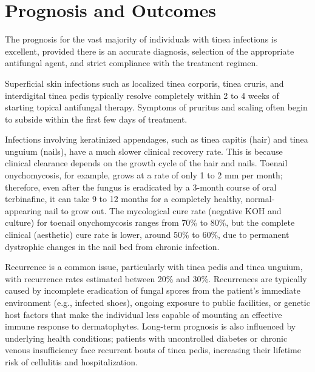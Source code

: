 \section*{Prognosis and Outcomes}
The prognosis for the vast majority of individuals with tinea infections is excellent, provided there is an accurate diagnosis, selection of the appropriate antifungal agent, and strict compliance with the treatment regimen.

Superficial skin infections such as localized tinea corporis, tinea cruris, and interdigital tinea pedis typically resolve completely within 2 to 4 weeks of starting topical antifungal therapy. Symptoms of pruritus and scaling often begin to subside within the first few days of treatment.

Infections involving keratinized appendages, such as tinea capitis (hair) and tinea unguium (nails), have a much slower clinical recovery rate. This is because clinical clearance depends on the growth cycle of the hair and nails. Toenail onychomycosis, for example, grows at a rate of only 1 to 2 mm per month; therefore, even after the fungus is eradicated by a 3-month course of oral terbinafine, it can take 9 to 12 months for a completely healthy, normal-appearing nail to grow out. The mycological cure rate (negative KOH and culture) for toenail onychomycosis ranges from 70\% to 80\%, but the complete clinical (aesthetic) cure rate is lower, around 50\% to 60\%, due to permanent dystrophic changes in the nail bed from chronic infection.

Recurrence is a common issue, particularly with tinea pedis and tinea unguium, with recurrence rates estimated between 20\% and 30\%. Recurrences are typically caused by incomplete eradication of fungal spores from the patient's immediate environment (e.g., infected shoes), ongoing exposure to public facilities, or genetic host factors that make the individual less capable of mounting an effective immune response to dermatophytes. Long-term prognosis is also influenced by underlying health conditions; patients with uncontrolled diabetes or chronic venous insufficiency face recurrent bouts of tinea pedis, increasing their lifetime risk of cellulitis and hospitalization.

